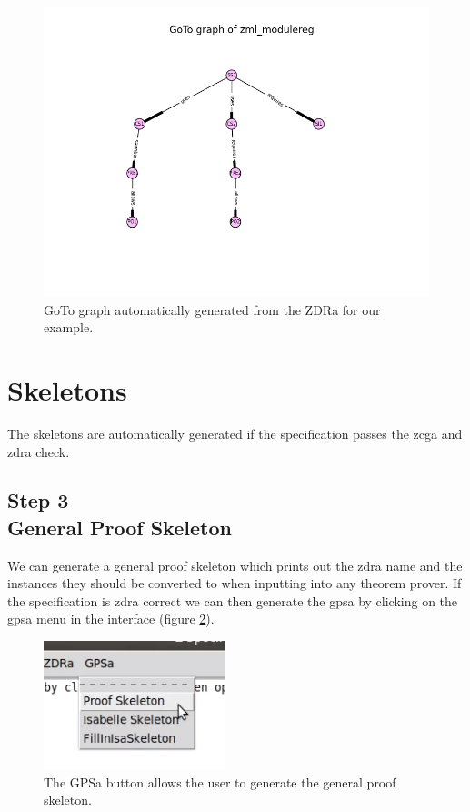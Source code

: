 \begin{figure}[H]
\centering
\includegraphics[scale=0.7]{Figures/fullexample/goto_fullexample.jpg}
\caption{GoTo graph automatically generated from the ZDRa for our example. \label{fig:gotoexample}}
\end{figure}

\section{Skeletons}

The skeletons are automatically generated if the specification passes the
\gls{zcga} and \gls{zdra} check.

\subsection{Step 3\\General Proof Skeleton}

We can generate a general proof skeleton which prints out the \gls{zdra} name
and the instances they should be converted to when inputting into any theorem
prover. If the specification is \gls{zdra} correct we can then generate the
\gls{gpsa} by clicking on the \gls{gpsa} menu in the interface (figure
\ref{fig:gpsabutton}).

\begin{figure}[H]
\centering
\includegraphics[scale=1]{Figures/fullexample/proofskelbutton.png}
\caption{The GPSa button allows the user to generate the general proof skeleton. \label{fig:gpsabutton}}
\end{figure}

